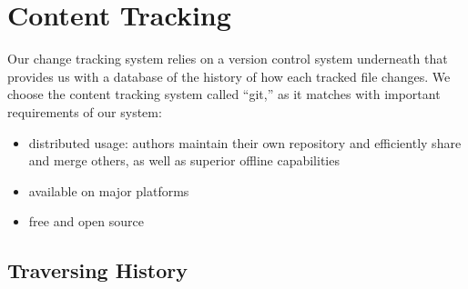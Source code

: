 	\newcommand{\figscale}{0.6}
\chapter{Content Tracking}
\minitoc

Our change tracking system relies on a version control system underneath that provides us with a database of the history of how each tracked file changes.  We choose the content tracking system called ``git,'' \cite{git} as it matches with important requirements of our system:
\begin{itemize}
\item distributed usage: authors maintain their own repository and efficiently share and merge others, as well as superior offline capabilities
\item available on major platforms %
\item free and open source
\end{itemize}

\section{Traversing History}

